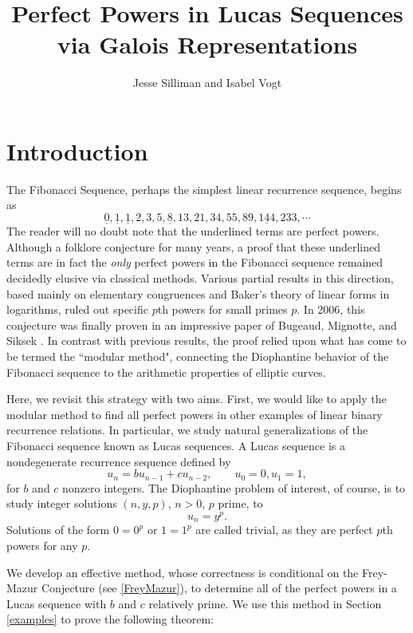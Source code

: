 \documentclass[12pt]{amsart}
\theoremstyle{definition}
\begin{document}
\title{Perfect Powers in Lucas Sequences via Galois Representations}
\author{Jesse Silliman and Isabel Vogt}

\maketitle


\section{Introduction}
The Fibonacci Sequence, perhaps the simplest linear recurrence sequence, begins as \[\underline{0},\underline{1},\underline{1},2,3,5,\underline{8},13,21,34,55,89,\underline{144},233, \cdots\] The reader will no doubt note that the underlined terms are perfect powers. Although a folklore conjecture for many years, a proof that these underlined terms are in fact the \emph{only} perfect powers in the Fibonacci sequence remained decidedly elusive via classical methods. Various partial results in this direction, based mainly on elementary congruences and Baker's theory of linear forms in logarithms, ruled out specific $p$th powers for small primes $p$. In 2006, this conjecture was finally proven in an impressive paper of Bugeaud, Mignotte, and Siksek \cite{siksek06}. In contrast with previous results, the proof relied upon what has come to be termed the ``modular method", connecting the Diophantine behavior of the Fibonacci sequence to the arithmetic properties of elliptic curves.

Here, we revisit this strategy with two aims. First, we would like to apply the modular method to find all perfect powers in other examples of linear binary recurrence relations.  In particular, we study natural generalizations of the Fibonacci sequence known as Lucas sequences.  A Lucas sequence is a nondegenerate recurrence sequence defined by \[ u_n = b u_{n-1} + c u_{n-2}, \qquad u_0 = 0, u_1 = 1, \] for $b$ and $c$ nonzero integers.  The Diophantine problem of interest, of course, is to study integer solutions $(n,y,p)$, $n > 0$, $p$ prime, to \begin{equation}\label{the_eqn}u_n = y^p.\end{equation}
Solutions of the form $0=0^p$ or $1 = 1^p$ are called trivial, as they are perfect $p$th powers for any $p$. 

We develop an effective method, whose correctness is conditional on the Frey-Mazur Conjecture (see \ref{FreyMazur}), to determine all of the perfect powers in a Lucas sequence with $b$ and $c$ relatively prime.  We use this method in Section \ref{examples} to prove the following theorem:
\end{document}
